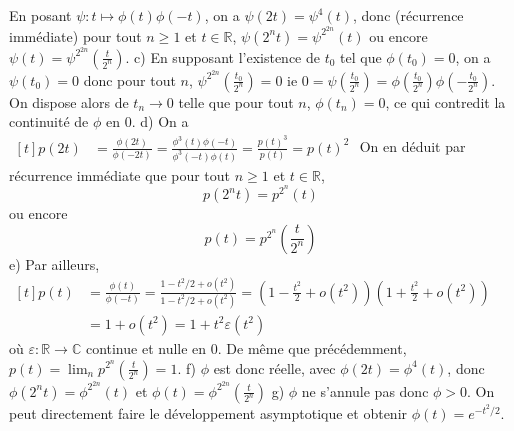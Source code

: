 \documentclass{report}
\begin{document}
En posant $\psi:t\mapsto \phi(t)\phi(-t) $, on a $\psi(2t)=\psi^4(t)$, donc (récurrence immédiate) pour tout $n\geq 1$ et $t\in \mathbb R$, $\psi(2^nt)=\psi^{2^{2n}}(t)$ ou encore $\psi(t)=\psi^{2^{2n}}(\frac{t}{2^n})$.\newline
\newline
c) En supposant l'existence de $t_0$ tel que $\phi(t_0)=0$, on a $\psi(t_0)=0$ donc pour tout $n$, $\psi^{2^{2n}}(\frac{t_0}{2^n})=0$ ie $0=\psi(\frac{t_0}{2^n})=\phi(\frac{t_0}{2^n})\phi(-\frac{t_0}{2^n})$. On dispose alors de $t_n\to 0$ telle que pour tout $n$, $\phi(t_n)=0$, ce qui contredit la continuité de $\phi$ en $0$.\newline
\newline
d) On a $\begin{aligned}[t]
p(2t) &= \frac{\phi(2t)}{\phi(-2t)} = \frac{\phi^3(t)\phi(-t)}{\phi^3(-t)\phi(t)} =\frac{p(t)^3}{p(t)}=p(t)^2
\end{aligned}$\newline
On en déduit par récurrence immédiate que pour tout $n\geq 1$ et $t\in \mathbb R$, $$p(2^n t)=p^{2^n}(t)$$
ou encore $$p(t)=p^{2^n}(\frac{t}{2^n})$$
e) Par ailleurs, $\begin{aligned}[t] p(t)&=\frac{\phi(t)}{\phi(-t)}=\frac{1-t^2/2+o(t^2)}{1-t^2/2+o(t^2)}=\left(1-\frac{t^2}{2}+o(t^2)\right)\left(1+\frac{t^2}{2}+o(t^2) \right)\\ &= 1+o(t^2) = 1+t^2\varepsilon(t^2)\end{aligned} $ où $\varepsilon:\mathbb R \to \mathbb C $ continue et nulle en $0$.\newline
De même que précédemment, $p(t)=\lim_n p^{2^n}(\frac{t}{2^n}) = 1$.\newline
\newline
f) $\phi$ est donc réelle, avec $\phi(2t)=\phi^4(t)$, donc $\phi(2^nt)=\phi^{2^{2n}}(t)$ et $\phi(t)=\phi^{2^{2n}}(\frac{t}{2^n})$\newline
\newline
g) $\phi$ ne s'annule pas donc $\phi>0$. On peut directement faire le développement asymptotique et obtenir $\phi(t)=e^{-t^2/2}$.
\end{document}
